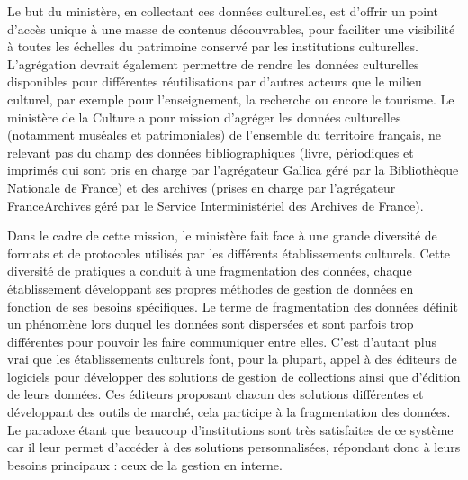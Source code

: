 Le but du ministère, en collectant ces données culturelles, est d'offrir un point d’accès unique à une masse de contenus découvrables, pour faciliter une visibilité à toutes les échelles du patrimoine conservé par les institutions culturelles. 
L’agrégation devrait également permettre de rendre les données culturelles disponibles pour différentes réutilisations par d’autres acteurs que le milieu culturel, par exemple pour l’enseignement, la recherche ou encore le tourisme.
Le ministère de la Culture a pour mission d’agréger les données culturelles (notamment muséales et patrimoniales) de l’ensemble du territoire français, ne relevant pas du champ des données bibliographiques (livre, périodiques et imprimés qui sont pris en charge par l’agrégateur Gallica géré par la Bibliothèque Nationale de France) et des archives (prises en charge par l’agrégateur FranceArchives géré par le Service Interministériel des Archives de France).\newline 

Dans le cadre de cette mission, le ministère fait face à une grande diversité de formats et de protocoles utilisés par les différents établissements culturels. 
Cette diversité de pratiques a conduit à une fragmentation des données, chaque établissement développant ses propres méthodes de gestion de données en fonction de ses besoins spécifiques. Le terme de fragmentation des données définit un phénomène lors duquel les données sont dispersées et sont parfois trop différentes pour pouvoir les faire communiquer entre elles. 
C’est d’autant plus vrai que les établissements culturels font, pour la plupart, appel à des éditeurs de logiciels pour développer des solutions de gestion de collections ainsi que d'édition de leurs données. Ces éditeurs proposant chacun des solutions différentes et développant des outils de marché, cela participe à la fragmentation des données. Le paradoxe étant que beaucoup d'institutions sont très satisfaites de ce système car il leur permet d’accéder à des solutions personnalisées, répondant donc à leurs besoins principaux : ceux de la gestion en interne.\newline

